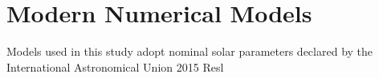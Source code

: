 \section{Modern Numerical Models}
Models used in this study adopt nominal solar parameters declared by the International Astronomical Union 2015 Resl